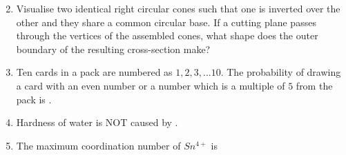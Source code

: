 \documentclass[journal]{IEEEtran}
\numberwithin{equation}{enumi}
\numberwithin{figure}{enumi}
\begin{document}
\begin{enumerate}[start=1, label={Q\arabic*.}]
\begin{enumerate}[label=(\Alph*)]
\begin{multicols}{2}
\begin{center}
\end{center}
  \end{multicols}
  \end{enumerate}
  \newpage
\item Visualise two identical right circular cones such that one is inverted over the other and they share a common circular base. If a cutting plane passes through the vertices of the assembled cones, what shape does the outer boundary of the resulting cross-section make?
 \begin{enumerate}[label=(\Alph*)]
  \end{enumerate}
 \item Ten cards in a pack are numbered as $1,2,3,...10$. The probability of drawing a card with an even number or a number which is a multiple of $5$ from the pack is \underline{\hspace{1.5cm}}.
\begin{enumerate}[label=(\Alph*)]
  \end{enumerate}
\item Hardness of water is NOT caused by \underline{\hspace{1.5cm}}.
\begin{enumerate}[label=(\Alph*)]
  \end{enumerate}
\item The maximum coordination number of $Sn^{4+}$ is \underline{\hspace{1.5cm}}

\end{enumerate}
\end{document}
